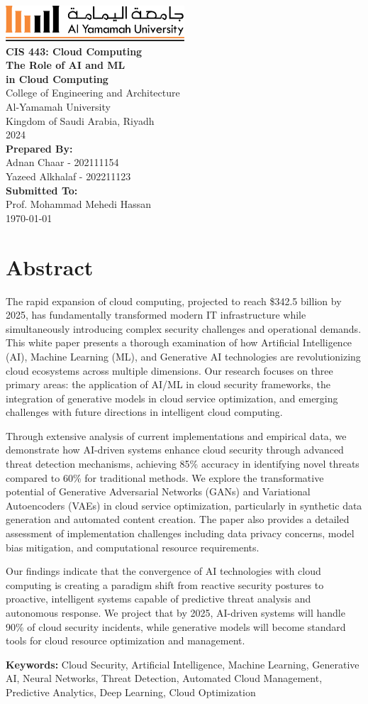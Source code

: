 \documentclass[a4paper,12pt]{article}
\def\maketitle{
  \begin{titlepage}
    \centering
    \vspace*{-1cm}
    \includegraphics[width=0.5\textwidth]{yu-logo.png}\\[2cm]
    {\huge\bfseries CIS 443: Cloud Computing \\[0.5cm] The Role of AI and ML\\[0.25cm]in Cloud Computing}\\[2cm]
    {\Large College of Engineering and Architecture}\\
    {Al-Yamamah University}\\
    {Kingdom of Saudi Arabia, Riyadh}\\[1cm]
    2024\\[2cm]
    {\large\bfseries Prepared By:}\\[0.3cm]
    Adnan Chaar - 202111154\\
    Yazeed Alkhalaf - 202211123\\
    [2cm]
    {\large\bfseries Submitted To:}\\[0.3cm]
    Prof. Mohammad Mehedi Hassan\\[2cm]
    {\large \today}
    \vfill
  \end{titlepage}
}
\begin{document}
\maketitle

\thispagestyle{fancy}
\tableofcontents
\newpage
\thispagestyle{fancy}
\listoffigures
\newpage

\setcounter{page}{1}

\section*{Abstract}
The rapid expansion of cloud computing, projected to reach \$342.5 billion by 2025, has fundamentally transformed modern IT infrastructure while simultaneously introducing complex security challenges and operational demands. This white paper presents a thorough examination of how Artificial Intelligence (AI), Machine Learning (ML), and Generative AI technologies are revolutionizing cloud ecosystems across multiple dimensions. Our research focuses on three primary areas: the application of AI/ML in cloud security frameworks, the integration of generative models in cloud service optimization, and emerging challenges with future directions in intelligent cloud computing.

Through extensive analysis of current implementations and empirical data, we demonstrate how AI-driven systems enhance cloud security through advanced threat detection mechanisms, achieving 85\% accuracy in identifying novel threats compared to 60\% for traditional methods. We explore the transformative potential of Generative Adversarial Networks (GANs) and Variational Autoencoders (VAEs) in cloud service optimization, particularly in synthetic data generation and automated content creation. The paper also provides a detailed assessment of implementation challenges including data privacy concerns, model bias mitigation, and computational resource requirements.

Our findings indicate that the convergence of AI technologies with cloud computing is creating a paradigm shift from reactive security postures to proactive, intelligent systems capable of predictive threat analysis and autonomous response. We project that by 2025, AI-driven systems will handle 90\% of cloud security incidents, while generative models will become standard tools for cloud resource optimization and management.

\textbf{Keywords:} Cloud Security, Artificial Intelligence, Machine Learning, Generative AI, Neural Networks, Threat Detection, Automated Cloud Management, Predictive Analytics, Deep Learning, Cloud Optimization
\end{document}
